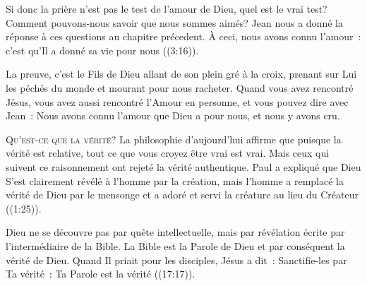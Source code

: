 Si donc la prière n'est pas le test de l'amour de Dieu, quel est le vrai test?
 Comment pouvons-nous savoir que nous sommes aimés?
 Jean nous a donné la réponse à ces questions au chapitre précedent.
 \og À ceci, nous avons connu l'amour~:
 c'est qu'Il a donné sa vie pour nous \fg{} ((3:16)). 


La preuve, c'est le Fils de Dieu allant de son plein gré à la croix,
 prenant sur Lui les péchés du monde et mourant pour nous racheter.
 Quand vous avez rencontré Jésus, vous avez aussi rencontré
 l'Amour en personne, et vous pouvez dire avec Jean~: 
 \og Nous avons connu l'amour que Dieu a pour nous, et nous y avons cru. \fg{}

\dvrule







\lettrine{Q}{u'est-ce que la vérité?}
 La philosophie d'aujourd'hui affirme que 
 \og puisque la vérité est relative, \fg{} 
 tout ce que vous croyez être vrai est vrai.
 Mais ceux qui suivent ce raisonnement ont rejeté la vérité authentique.
 Paul a expliqué que Dieu S'est clairement révélé à l'homme par la création,
 mais l'homme \og a remplacé la vérité de Dieu par le mensonge
 et a adoré et servi la créature au lieu du Créateur \fg{}
 ((1:25)). 


Dieu ne se découvre pas par quête intellectuelle, mais par révélation écrite
 \ocadr par l'intermédiaire de la Bible.
 La Bible est la Parole de Dieu et par conséquent la vérité de Dieu.
 Quand Il priait pour les disciples, Jésus a dit~: 
 \og Sanctifie-les par Ta vérité~: Ta Parole est la vérité \fg{} 
 ((17:17)). 

